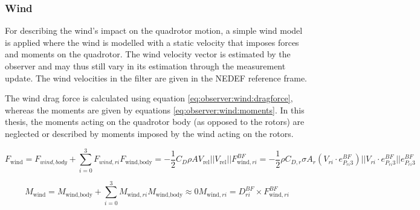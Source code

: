 \subsubsection{Wind}
    For describing the wind's impact on the quadrotor motion,
    a simple wind model is applied where the wind is modelled with
    a static velocity that imposes forces and moments on the quadrotor.
    The wind velocity vector is estimated by the observer and may thus still vary
    in its estimation through the measurement update.
    The wind velocities in the filter are given in the NEDEF reference frame.

    The wind drag force is calculated using equation \eqref{eq:observer:wind:dragforce},
    whereas the moments are given by equations \eqref{eq:observer:wind:moments}.
    In this thesis, the moments acting on the quadrotor body (as opposed to the rotors)
    are neglected or described by moments imposed by the wind acting on the rotors.

    \begin{subequations}
    \label{eq:observer:wind:dragforce}
        \begin{equation}
            F_{\text{wind}} = F_{wind,body} + \sum_{i=0}^{3} F_{wind,ri}
        \end{equation}
        \begin{equation}
            F_{\text{wind,body}} = -\frac{1}{2} C_{D} \rho A V_{\text{rel}} ||V_{\text{rel}}||
        \end{equation}
        \begin{equation}
            F^{BF}_{\text{wind},ri} = -\frac{1}{2} \rho C_{D,r} \sigma A_{r} (V_{ri} \cdot e_{P_{ri}3}^{BF}) ||V_{ri} \cdot e_{P_{ri}3}^{BF}|| e_{P_{ri}3}^{BF}
        \end{equation}
    \end{subequations}

    \begin{subequations}
    \label{eq:observer:wind:moments}
        \begin{equation}
            M_{\text{wind}} = M_{\text{wind,body}} + \sum_{i=0}^{3}M_{\text{wind},ri}
        \end{equation}
        \begin{equation}
            M_{\text{wind,body}} \approx 0 %
        \end{equation}
        \begin{equation}
            M_{\text{wind},ri} = D_{ri}^{BF} \times F^{BF}_{\text{wind},ri}
        \end{equation}
    \end{subequations}

